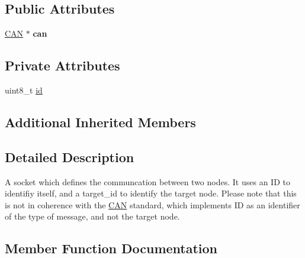 \subsection*{Public Attributes}
\begin{DoxyCompactItemize}
\item 
\hyperlink{class_c_a_n}{C\+AN} $\ast$ {\bfseries can}\hypertarget{class_s_o_c_k_e_t_a40e1973f231f6e5c51f02bfb8e7c0722}{}\label{class_s_o_c_k_e_t_a40e1973f231f6e5c51f02bfb8e7c0722}

\end{DoxyCompactItemize}
\subsection*{Private Attributes}
\begin{DoxyCompactItemize}
\item 
uint8\+\_\+t \hyperlink{class_s_o_c_k_e_t_a0755fe74751c2d94d3d1679cad9e6544}{id}
\end{DoxyCompactItemize}
\subsection*{Additional Inherited Members}


\subsection{Detailed Description}
A socket which defines the communcation between two nodes. It uses an ID to identifiy itself, and a target\+\_\+id to identify the target node. Please note that this is not in coherence with the \hyperlink{class_c_a_n}{C\+AN} standard, which implements ID as an identifier of the type of message, and not the target node. 

\subsection{Member Function Documentation}
